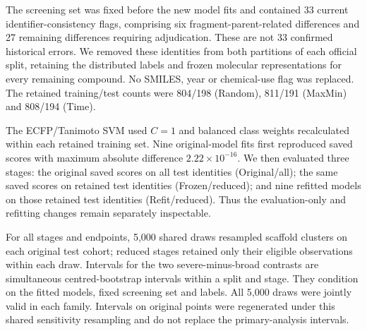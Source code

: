 The screening set was fixed before the new model fits and contained 33 current identifier-consistency flags, comprising six fragment-parent-related differences and 27 remaining differences requiring adjudication. These are not 33 confirmed historical errors. We removed these identities from both partitions of each official split, retaining the distributed labels and frozen molecular representations for every remaining compound. No SMILES, year or chemical-use flag was replaced. The retained training/test counts were 804/198 (Random), 811/191 (MaxMin) and 808/194 (Time).

The ECFP/Tanimoto SVM used $C=1$ and balanced class weights recalculated within each retained training set. Nine original-model fits first reproduced saved scores with maximum absolute difference $2.22\times10^{-16}$. We then evaluated three stages: the original saved scores on all test identities (Original/all); the same saved scores on retained test identities (Frozen/reduced); and nine refitted models on those retained test identities (Refit/reduced). Thus the evaluation-only and refitting changes remain separately inspectable.

For all stages and endpoints, 5,000 shared draws resampled scaffold clusters on each original test cohort; reduced stages retained only their eligible observations within each draw. Intervals for the two severe-minus-broad contrasts are simultaneous centred-bootstrap intervals within a split and stage. They condition on the fitted models, fixed screening set and labels. All 5,000 draws were jointly valid in each family. Intervals on original points were regenerated under this shared sensitivity resampling and do not replace the primary-analysis intervals.

